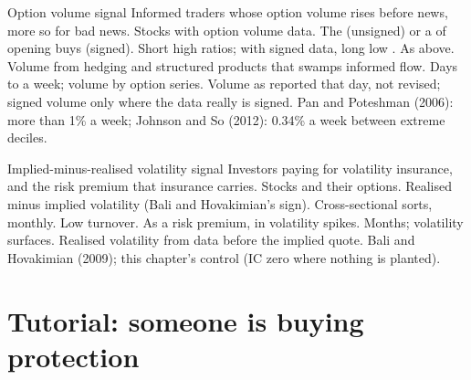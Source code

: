 \begin{strategyfile}{Option volume signal}\label{strat:s1:options-implied-signals-for-stocks:volume}
 Informed traders whose option volume rises before news, more so for bad news.
 Stocks with option volume data.
 The  (unsigned) or a  of opening buys (signed).
 Short high ratios; with signed data, long low .
 As above.
 Volume from hedging and structured products that swamps informed flow.
 Days to a week; volume by option series.
 Volume as reported that day, not revised; signed volume only where the data really is signed.
 Pan and Poteshman (2006): more than 1\% a week; Johnson and So (2012): 0.34\% a week between extreme deciles.
\end{strategyfile}

\begin{strategyfile}{Implied-minus-realised volatility signal}\label{strat:s1:options-implied-signals-for-stocks:ivrv}
 Investors paying for volatility insurance, and the risk premium that insurance carries.
 Stocks and their options.
 Realised minus implied volatility (Bali and Hovakimian's sign).
 Cross-sectional sorts, monthly.
 Low turnover.
 As a risk premium, in volatility spikes.
 Months; volatility surfaces.
 Realised volatility from data before the implied quote.
 Bali and Hovakimian (2009); this chapter's control (IC zero where nothing is planted).
\end{strategyfile}

\section{Tutorial: someone is buying protection}\label{tut:s1:options-implied-signals-for-stocks:tut}

